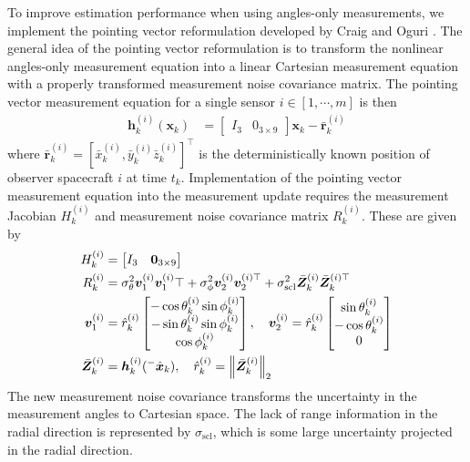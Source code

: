 \documentclass[letterpaper, preprint, paper,11pt]{AAS}	%
\begin{document}
To improve estimation performance when using angles-only measurements, we implement the pointing vector reformulation developed by Craig and Oguri \cite{craig2024robust}. The general idea of the pointing vector reformulation is to transform the nonlinear angles-only measurement equation into a linear Cartesian measurement equation with a properly transformed measurement noise covariance matrix. The pointing vector measurement equation for a single sensor $i \in [1, \cdots, m]$ is then 
\begin{align}
    \bm{h}_k^{(i)}(\bm{x}_k) &= \begin{bmatrix}
        I_3 & 0_{3 \times 9}
    \end{bmatrix} \bm{x}_k - \bar{\bm{r}}_k^{(i)}
\end{align}
\noindent where $\bar{\bm{r}}_k^{(i)} = [\bar{x}_k^{(i)}, \bar{y}_k^{(i)}\bar{z}_k^{(i)}]^\top$ is the deterministically known position of observer spacecraft $i$ at time $t_k$. Implementation of the pointing vector measurement equation into the measurement update requires the measurement Jacobian $H_k^{(i)}$ and measurement noise covariance matrix $R_k^{(i)}$. These are given by
\begin{align}
    H_k^{(i)} &= \begin{bmatrix}
        I_3 & \bm{0}_{3 \times 9} 
    \end{bmatrix} \\
    R_k^{(i)} &= \sigma_\theta^2 \bm{v}_1^{(i)}\bm{v}_1^{(i)}\top + \sigma_\phi^2\bm{v}_2^{(i)}\bm{v}_2^{(i)\top} + \sigma_\text{scl}^2 \bar{\bm{Z}}_k^{(i)} \bar{\bm{Z}}_k^{(i)\top} \\
    \bm{v}_1^{(i)} &= \hat{r}_k^{(i)}\begin{bmatrix}
        -\cos \theta_k^{(i)} \sin \phi_k^{(i)} \\
        -\sin \theta_k^{(i)} \sin \phi_k^{(i)} \\
        \cos \phi_k^{(i)}
    \end{bmatrix}, \quad \bm{v}_2^{(i)} = \hat{r}_k^{(i)} \begin{bmatrix}
        \sin \theta_k^{(i)} \\
        -\cos \theta_k^{(i)} \\
        0
    \end{bmatrix} \notag \\
    \bar{\bm{Z}}_k^{(i)} &= \bm{h}_k^{(i)}({}^-\hat{\bm{x}}_k), \quad \hat{r}_k^{(i)} = \norm{\bar{\bm{Z}}_k^{(i)}}_2 \notag
\end{align}
The new measurement noise covariance transforms the uncertainty in the measurement angles to Cartesian space. The lack of range information in the radial direction is represented by $\sigma_\text{scl}$, which is some large uncertainty projected in the radial direction. 
\end{document}
